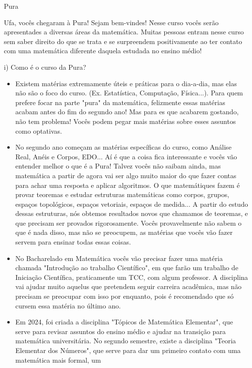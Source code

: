\begin{subsecao}{Pura}


Ufa, vocês chegaram à Pura! Sejam bem-vindes! Nesse curso vocês serão apresentades a
diversas áreas da matemática. Muitas pessoas entram nesse curso
sem saber direito do que se trata e se surpreendem positivamente ao ter contato com uma matemática
diferente daquela estudada no ensino médio!


i) Como é o curso da Pura?
\begin{itemize}
\item  Existem matérias extremamente úteis e práticas para o dia-a-dia, mas elas
não são o foco do curso. (Ex. Estatística, Computação, Física...). Para quem 
prefere focar na parte "pura" da matemática, felizmente essas matérias acabam antes do fim do segundo ano!
Mas para es que acabarem gostando, não tem problema! Vocês podem pegar mais matérias sobre esses assuntos
como optativas.
\item No segundo ano começam as matérias específicas do curso, como Análise Real,
Anéis e Corpos, EDO... Aí é que a coisa fica interessante e vocês vão entender
melhor o que é a Pura! Talvez vocês não saibam ainda, mas matemática a partir de
agora vai ser algo muito maior do que fazer contas para achar uma resposta e aplicar
algoritmos. O que matemátiques fazem é provar teoremas e estudar estruturas matemáticas como corpos, grupos,
espaços topológicos, espaços vetoriais, espaços de medida...
A partir do estudo dessas estruturas, nós obtemos resultados novos que chamamos de teoremas, e que precisam
ser provados rigorosamente. Vocês provavelmente não sabem o que é nada disso, mas não se preocupem, 
as matérias que vocês vão fazer servem para ensinar todas essas coisas.
\item No Bacharelado em Matemática vocês vão precisar fazer uma matéria chamada "Introdução 
ao trabalho Científico", em que farão um trabalho de Iniciação Científica, praticamente um TCC, com algum 
professor. A disciplina vai ajudar muito aquelus que pretendem seguir carreira acadêmica, mas não
precisam se preocupar com isso por enquanto, pois é recomendado que só cursem essa matéria no último ano.
\item Em 2024, foi criada a disciplina "Tópicos de Matemática Elementar", que serve para revisar assuntos
do ensino médio e ajudar na transição para matemática universitária. No segundo semestre, existe a disciplina 
"Teoria Elementar dos Números", que serve para dar um primeiro contato com uma matemática mais formal, um

\end{itemize}
\end{subsecao}
